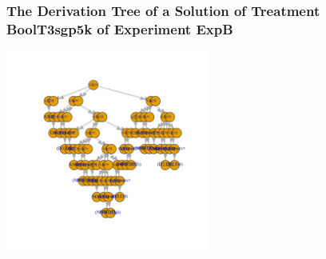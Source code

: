  \begin{frame}
 \frametitle{ The Derivation Tree of a Solution of Treatment BoolT3sgp5k of Experiment ExpB }
 \begin{center}
\includegraphics[width=0.5\textwidth, angle=0]
{ExpBDerivationTreeFigure018.pdf}
 \end{center}
 \label{report/ExpBDerivationTreeFigure018.pdf}  
 \end{frame}

